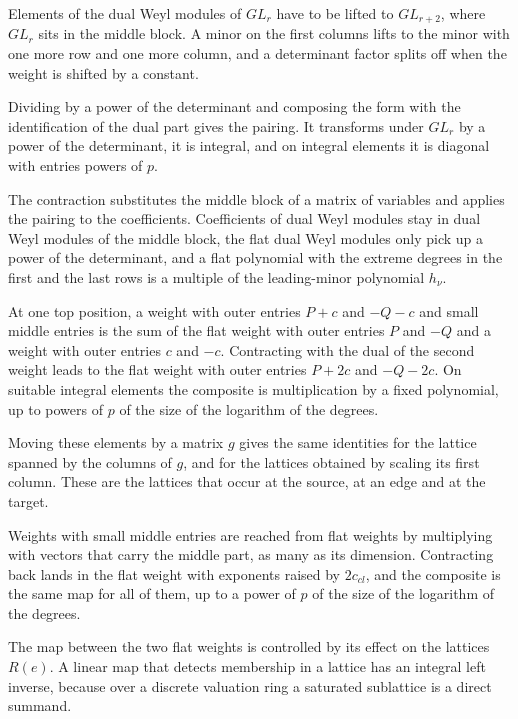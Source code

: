 Elements of the dual Weyl modules of $GL_r$ have to be lifted to $GL_{r+2}$, where $GL_r$ sits in the
middle block. A minor on the first columns lifts to the minor with one more row and one more column,
and a determinant factor splits off when the weight is shifted by a constant.

Dividing by a power of the determinant and composing the form with the identification of the dual
part gives the pairing. It transforms under $GL_r$ by a power of the determinant, it is integral,
and on integral elements it is diagonal with entries powers of $p$.

The contraction substitutes the middle block of a matrix of variables and applies the pairing to the
coefficients. Coefficients of dual Weyl modules stay in dual Weyl modules of the middle block, the
flat dual Weyl modules only pick up a power of the determinant, and a flat polynomial with the extreme
degrees in the first and the last rows is a multiple of the leading-minor polynomial $h_\nu$.

At one top position, a weight with outer entries $P+c$ and $-Q-c$ and small middle entries is the sum
of the flat weight with outer entries $P$ and $-Q$ and a weight with outer entries $c$ and $-c$.
Contracting with the dual of the second weight leads to the flat weight with outer entries $P+2c$ and
$-Q-2c$. On suitable integral elements the composite is multiplication by a fixed polynomial, up to
powers of $p$ of the size of the logarithm of the degrees.

Moving these elements by a matrix $g$ gives the same identities for the lattice spanned by the
columns of $g$, and for the lattices obtained by scaling its first column. These are the lattices
that occur at the source, at an edge and at the target.

Weights with small middle entries are reached from flat weights by multiplying with vectors that
carry the middle part, as many as its dimension. Contracting back lands in the flat weight with
exponents raised by $2c_{cl}$, and the composite is the same map for all of them, up to a power of
$p$ of the size of the logarithm of the degrees.

The map between the two flat weights is controlled by its effect on the lattices $R(e)$. A linear
map that detects membership in a lattice has an integral left inverse, because over a discrete
valuation ring a saturated sublattice is a direct summand.


